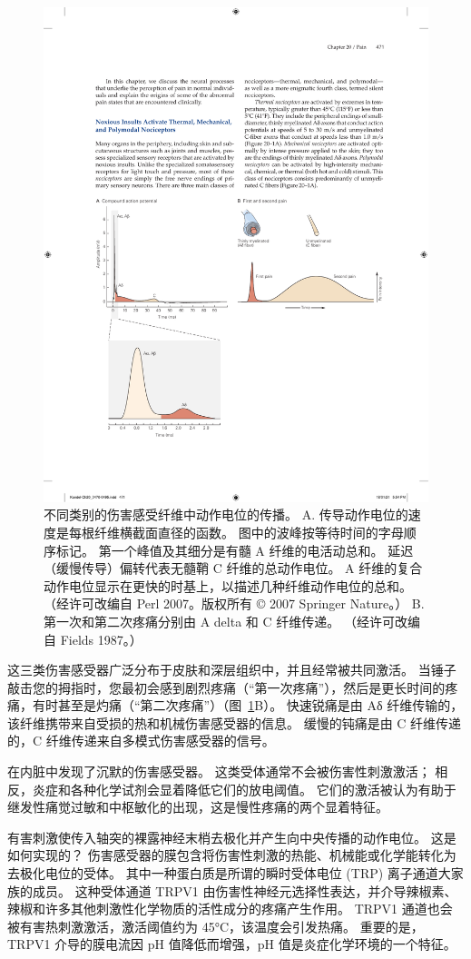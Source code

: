\begin{figure}[htbp]
	\centering
	\includegraphics[width=0.7\linewidth]{chap20/fig_20_1}
	\caption{不同类别的伤害感受纤维中动作电位的传播。 
		A. 传导动作电位的速度是每根纤维横截面直径的函数。
		图中的波峰按等待时间的字母顺序标记。
		第一个峰值及其细分是有髓 A 纤维的电活动总和。 
		延迟（缓慢传导）偏转代表无髓鞘 C 纤维的总动作电位。
		A 纤维的复合动作电位显示在更快的时基上，以描述几种纤维动作电位的总和。 （经许可改编自 Perl 2007。版权所有 © 2007 Springer Nature。） 
		B. 第一次和第二次疼痛分别由 A delta 和 C 纤维传递。 （经许可改编自 Fields 1987。）}
	\label{fig:20_1}
\end{figure}


这三类伤害感受器广泛分布于皮肤和深层组织中，并且经常被共同激活。
当锤子敲击您的拇指时，您最初会感到剧烈疼痛（“第一次疼痛”），然后是更长时间的疼痛，有时甚至是灼痛（“第二次疼痛”）（图~\ref{fig:20_1}B）。
快速锐痛是由 Aδ 纤维传输的，该纤维携带来自受损的热和机械伤害感受器的信息。
缓慢的钝痛是由 C 纤维传递的，C 纤维传递来自多模式伤害感受器的信号。


在内脏中发现了沉默的伤害感受器。
这类受体通常不会被伤害性刺激激活；
相反，炎症和各种化学试剂会显着降低它们的放电阈值。
它们的激活被认为有助于继发性痛觉过敏和中枢敏化的出现，这是慢性疼痛的两个显着特征。


有害刺激使传入轴突的裸露神经末梢去极化并产生向中央传播的动作电位。
这是如何实现的？
伤害感受器的膜包含将伤害性刺激的热能、机械能或化学能转化为去极化电位的受体。
其中一种蛋白质是所谓的瞬时受体电位 (TRP) 离子通道大家族的成员。
这种受体通道 TRPV1 由伤害性神经元选择性表达，并介导辣椒素、辣椒和许多其他刺激性化学物质的活性成分的疼痛产生作用。
TRPV1 通道也会被有害热刺激激活，激活阈值约为 45°C，该温度会引发热痛。
重要的是，TRPV1 介导的膜电流因 pH 值降低而增强，pH 值是炎症化学环境的一个特征。


